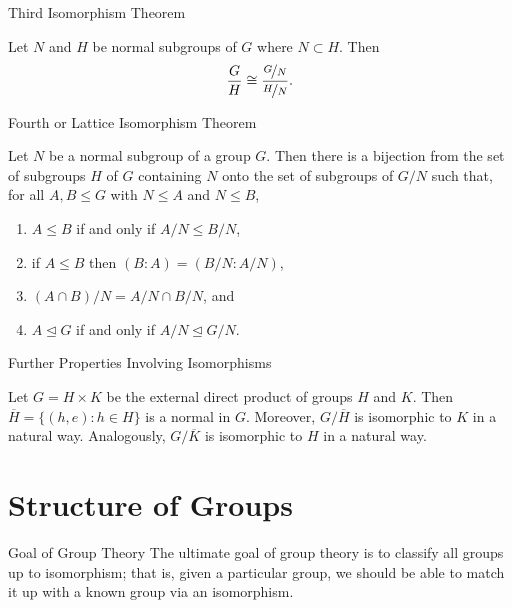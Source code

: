\documentclass{beamer}
\begin{document}
\begin{frame}{Third Isomorphism Theorem}
    \begin{theorem}
        \justifying
        Let $N$ and $H$ be normal subgroups of $G$ where $N \subset H$. Then
        \[\dfrac{G}{H} \cong \dfrac{\nicefrac{G}{N}}{\nicefrac{H}{N}}.\]
    \end{theorem}
\end{frame}

\begin{frame}{Fourth or Lattice Isomorphism Theorem}
    \begin{theorem}
        \justifying 
        Let $N$ be a normal subgroup of a group $G$. Then there is a bijection from the set of subgroups $H$ of $G$ containing $N$ onto the set of subgroups of $G/N$ such that, for all $A, B \leq G$ with $N \leq A$ and $N \leq B$,
        \begin{enumerate}
            \item $A \leq B$ if and only if $A/N \leq B/N$,
            \item if $A \leq B$ then $(B:A) = (B/N:A/N)$,
            \item $(A \cap B)/N = A/N \cap B/N$, and
            \item $A \unlhd G$ if and only if $A/N \unlhd G/N$.
        \end{enumerate}
    \end{theorem}
\end{frame}

\begin{frame}{Further Properties Involving Isomorphisms}
    \begin{theorem}
        \justifying
        Let $G = H \times K$ be the external direct product of groups $H$ and $K$. Then $\overline{H} = \{(h, e) : h \in H\}$ is a normal in $G$. Moreover, $G/\overline{H}$ is isomorphic to $K$ in a natural way. Analogously, $G/\overline{K}$ is isomorphic to $H$ in a natural way.
    \end{theorem}
\end{frame}

\section{Structure of Groups}

\begin{frame}{Goal of Group Theory}
    \justifying
    The ultimate goal of group theory is to classify all groups up to isomorphism; that is, given a particular group, we should be able to match it up with a known group via an isomorphism.
\end{frame}
\end{document}
